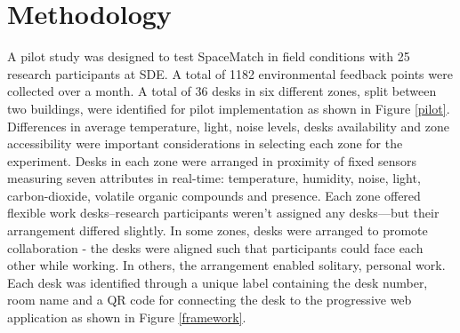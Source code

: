\documentclass[]{interact}
\theoremstyle{plain}%
\theoremstyle{definition}
\theoremstyle{remark}
\begin{document}


\section{Methodology}


A pilot study was designed to test SpaceMatch in field conditions with 25 research participants at SDE. A total of 1182 environmental feedback points were collected over a month. A total of 36 desks in six different zones, split between two buildings, were identified for pilot implementation as shown in Figure \ref{pilot}. Differences in average temperature, light, noise levels, desks availability and zone accessibility were important considerations in selecting each zone for the experiment. Desks in each zone were arranged in proximity of fixed sensors measuring seven attributes in real-time: temperature, humidity, noise, light, carbon-dioxide, volatile organic compounds and presence. Each zone offered flexible work desks--research participants weren't assigned any desks---but their arrangement differed slightly. In some zones, desks were arranged to promote collaboration - the desks were aligned such that participants could face each other while working. In others, the arrangement enabled solitary, personal work. Each desk was identified through a unique label containing the desk number, room name and a QR code for connecting the desk to the progressive web application as shown in Figure \ref{framework}.
\end{document}
